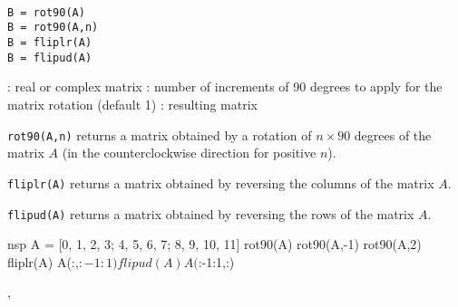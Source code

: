 
\begin{mandesc}
  \\
  \\
  \\
\end{mandesc}

\begin{calling_sequence}
\begin{verbatim}
B = rot90(A)
B = rot90(A,n)
B = fliplr(A)
B = flipud(A)
\end{verbatim}
\end{calling_sequence}
\begin{parameters}
  \begin{varlist}
    : real or complex matrix
    : number of increments of 90 degrees to apply for the matrix rotation (default 1)
    : resulting matrix
  \end{varlist}
\end{parameters}

\begin{mandescription}

\verb+rot90(A,n)+ returns a matrix obtained by a rotation of $n \times 90$ degrees of the
matrix $A$ (in the counterclockwise direction for positive $n$).

\verb+fliplr(A)+ returns a matrix obtained by reversing the columns of the matrix $A$.

\verb+flipud(A)+ returns a matrix obtained by reversing the rows of the matrix $A$.

\end{mandescription}
 
\begin{examples}
  \begin{mintednsp}{nsp}
    A = [0, 1, 2, 3; 4, 5, 6, 7; 8, 9, 10, 11]
    rot90(A)
    rot90(A,-1)
    rot90(A,2)
    fliplr(A) 
    A(:,$:-1:1)
    flipud(A) 
    A($:-1:1,:)
  \end{mintednsp}
\end{examples}


\begin{manseealso}
  , 
\end{manseealso}

